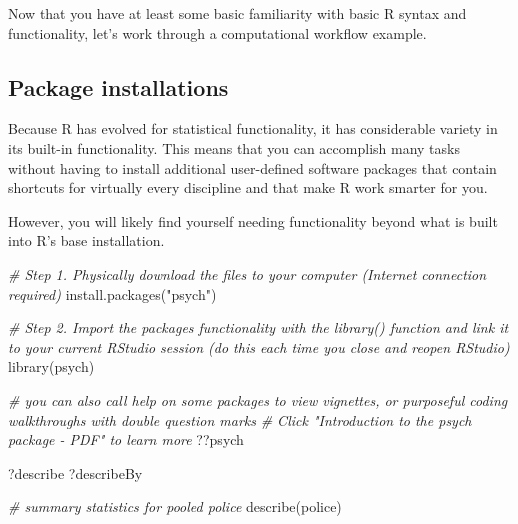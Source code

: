 \documentclass[
]{article}
\newenvironment{Shaded}{\begin{snugshade}}{\end{snugshade}}
\newcommand{\CommentTok}[1]{\textcolor[rgb]{0.56,0.35,0.01}{\textit{#1}}}
\newcommand{\FunctionTok}[1]{\textcolor[rgb]{0.00,0.00,0.00}{#1}}
\newcommand{\NormalTok}[1]{#1}
\newcommand{\StringTok}[1]{\textcolor[rgb]{0.31,0.60,0.02}{#1}}
\begin{document}
Now that you have at least some basic familiarity with basic R syntax
and functionality, let's work through a computational workflow example.

\hypertarget{package-installations}{%
\subsection{Package installations}\label{package-installations}}

Because R has evolved for statistical functionality, it has considerable
variety in its built-in functionality. This means that you can
accomplish many tasks without having to install additional user-defined
software packages that contain shortcuts for virtually every discipline
and that make R work smarter for you.

However, you will likely find yourself needing functionality beyond what
is built into R's base installation.

\begin{Shaded}
\begin{Highlighting}[]
\CommentTok{\# Step 1. Physically download the files to your computer (Internet connection required)}
\FunctionTok{install.packages}\NormalTok{(}\StringTok{"psych"}\NormalTok{)}
\end{Highlighting}
\end{Shaded}

\begin{Shaded}
\begin{Highlighting}[]
\CommentTok{\# Step 2. Import the package\textquotesingle{}s functionality with the library() function and link it to your current RStudio session (do this each time you close and reopen RStudio)}
\FunctionTok{library}\NormalTok{(psych)}
\end{Highlighting}
\end{Shaded}

\begin{Shaded}
\begin{Highlighting}[]
\CommentTok{\# you can also call help on some packages to view vignette\textquotesingle{}s, or purposeful coding walkthroughs with double question marks}
\CommentTok{\# Click "Introduction to the psych package {-} PDF" to learn more}
\NormalTok{??psych}

\NormalTok{?describe}
\NormalTok{?describeBy}
\end{Highlighting}
\end{Shaded}

\begin{Shaded}
\begin{Highlighting}[]
\CommentTok{\# summary statistics for pooled police}
\FunctionTok{describe}\NormalTok{(police)}
\end{Highlighting}
\end{Shaded}
\end{document}
